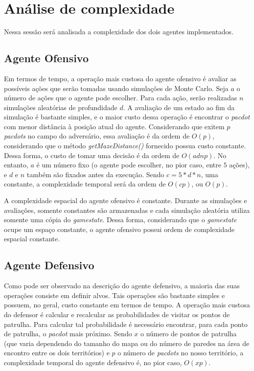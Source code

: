 \documentclass[a4paper,12pt]{article}
\begin{document}
\section{Análise de complexidade}
Nessa sessão será analisada a complexidade dos dois agentes implementados.

\subsection{Agente Ofensivo}
Em termos de tempo, a operação mais custosa do agente ofensivo é avaliar as possíveis ações
que serão tomadas usando simulações de Monte Carlo. Seja $a$ o número de ações
que o agente pode escolher. Para cada ação, serão realizadas $n$ simulações
aleatórias de profundidade $d$. A avaliação de um estado ao fim da simulação
é bastante simples, e o maior custo dessa operação é encontrar o \textit{pacdot}
com menor distância à posição atual do agente. Considerando que exitem $p$
\textit{pacdots} no campo do adversário, essa avaliação é da ordem de $O(p)$,
considerando que o método \textit{getMazeDistance()} fornecido possua custo
constante. Dessa forma, o custo de tomar uma decisão é da ordem de $O(adnp)$.
No entanto, $a$ é um número fixo (o agente pode escolher, no pior caso, entre $5$ ações), e
$d$ e $n$ também são fixados antes da execução. Sendo $c = 5 * d * n$, uma constante,
a complexidade temporal será da ordem de $O(cp)$, ou $O(p)$.

A complexidade espacial do agente ofensivo é constante. Durante as simulações e
avaliações, somente constantes são armazenadas e cada simulação aleatória utiliza
somente uma cópia do \textit{gamestate}. Dessa forma, considerando que o \textit{gamestate}
ocupe um espaço constante, o agente ofensivo possui ordem de complexidade espacial
constante.

\subsection{Agente Defensivo}
Como pode ser observado na descrição do agente defensivo, a maioria das suas
operações consiste em definir alvos. Tais operações são bastante
simples e possuem, no geral, custo constante em termos de tempo. A operação mais custosa do defensor
é calcular e recalcular as probabilidades de visitar os pontos de patrulha. Para calcular tal
probabilidade é necessário encontrar, para cada ponto de patrulha, o \textit{pacdot} mais próximo.
Sendo $x$ o número de pontos de patrulha (que varia dependendo do tamanho do mapa ou do número
de paredes na área de encontro entre os dois territórios) e $p$ o número de \textit{pacdots}
no nosso território, a complexidade temporal do agente defensivo é, no pior caso, $O(xp)$.
\end{document}
